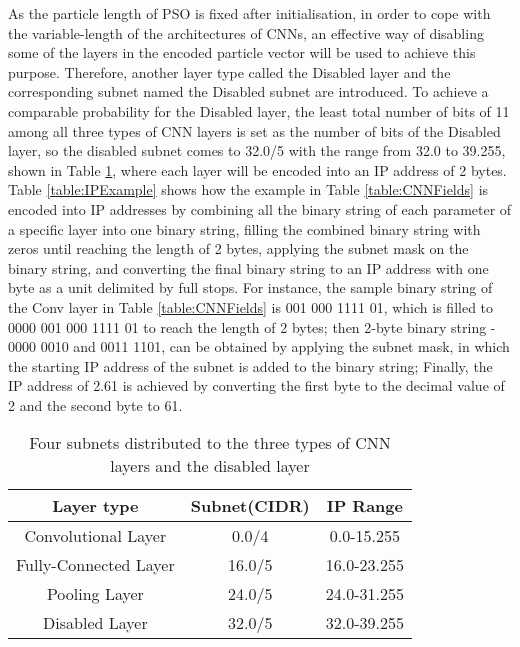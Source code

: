 \documentclass[conference]{IEEEtran}
\begin{document}
As the particle length of PSO is fixed after initialisation, in order to cope with the variable-length of the architectures of CNNs, an effective way of disabling some of the layers in the encoded particle vector will be used to achieve this purpose. Therefore, another layer type called the Disabled layer and the corresponding subnet named the Disabled subnet are introduced. To achieve a comparable probability for the Disabled layer, the least total number of bits of 11 among all three types of CNN layers is set as the number of bits of the Disabled layer, so the disabled subnet comes to 32.0/5 with the range from 32.0 to 39.255, shown in Table \ref{table:Subnets}, where each layer will be encoded into an IP address of 2 bytes. Table \ref{table:IPExample} shows how the example in Table \ref{table:CNNFields} is encoded into IP addresses by combining all the binary string of each parameter of a specific layer into one binary string, filling the combined binary string with zeros until reaching the length of 2 bytes, applying the subnet mask on the binary string, and converting the final binary string to an IP address with one byte as a unit delimited by full stops. For instance, the sample binary string of the Conv layer in Table \ref{table:CNNFields} is 001 000 1111 01, which is filled to 0000 001 000 1111 01 to reach the length of 2 bytes; then 2-byte binary string - 0000 0010 and 0011 1101, can be obtained by applying the subnet mask, in which the starting IP address of the subnet is added to the binary string; Finally, the IP address of 2.61 is achieved by converting the first byte to the decimal value of 2 and the second byte to 61.



\begin{table}[!t]
	\renewcommand{\arraystretch}{1.3}
	\caption{Four subnets distributed to the three types of CNN layers and the disabled layer}
	\label{table:Subnets}
	\centering
	\begin{tabular}{|c|c|c|}
		\hline
		Layer type & Subnet(CIDR) & IP Range\\
		\hline
		Convolutional Layer & 0.0/4 & 0.0-15.255\\
		\hline
		Fully-Connected Layer & 16.0/5 & 16.0-23.255\\
		\hline
		Pooling Layer & 24.0/5 & 24.0-31.255\\
		\hline
		Disabled Layer & 32.0/5 & 32.0-39.255\\
		\hline
	\end{tabular}
\end{table}
\end{document}
